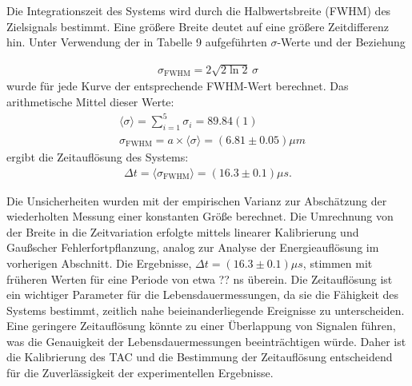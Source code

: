 Die Integrationszeit des Systems wird durch die Halbwertsbreite (FWHM) des Zielsignals bestimmt. Eine größere Breite deutet auf eine größere Zeitdifferenz hin. Unter Verwendung der in Tabelle 9 aufgeführten $\sigma$-Werte und der Beziehung

\begin{align*}
  \sigma_{\mathrm{FWHM}} = 2\sqrt{2\ln 2}\,\sigma
\end{align*}
wurde für jede Kurve der entsprechende FWHM-Wert berechnet. Das arithmetische Mittel dieser Werte:
\begin{align*}
  &\langle\sigma\rangle=\sum_{i=1}^{5}\sigma_i=89.84(1)\\
  &\sigma_{\mathrm{FWHM}}=a\times\langle\sigma\rangle=(6.81\pm0.05)\mu m
\end{align*}
ergibt die Zeitauflösung des Systems:
\begin{align*}
  \Delta t = \langle \sigma_{\mathrm{FWHM}} \rangle = (16.3\pm0.1) \mu s.
\end{align*}

Die Unsicherheiten wurden mit der empirischen Varianz zur Abschätzung der wiederholten Messung einer konstanten Größe berechnet. Die Umrechnung von der Breite in die Zeitvariation erfolgte mittels linearer Kalibrierung und Gaußscher Fehlerfortpflanzung, analog zur Analyse der Energieauflösung im vorherigen Abschnitt. Die Ergebnisse, $\Delta t =(16.3\pm0.1) \mu s$, stimmen mit früheren Werten für eine Periode von etwa ?? ns überein. Die Zeitauflösung ist ein wichtiger Parameter für die Lebensdauermessungen, da sie die Fähigkeit des Systems bestimmt, zeitlich nahe beieinanderliegende Ereignisse zu unterscheiden. Eine geringere Zeitauflösung könnte zu einer Überlappung von Signalen führen, was die Genauigkeit der Lebensdauermessungen beeinträchtigen würde. Daher ist die Kalibrierung des TAC und die Bestimmung der Zeitauflösung entscheidend für die Zuverlässigkeit der experimentellen Ergebnisse.
